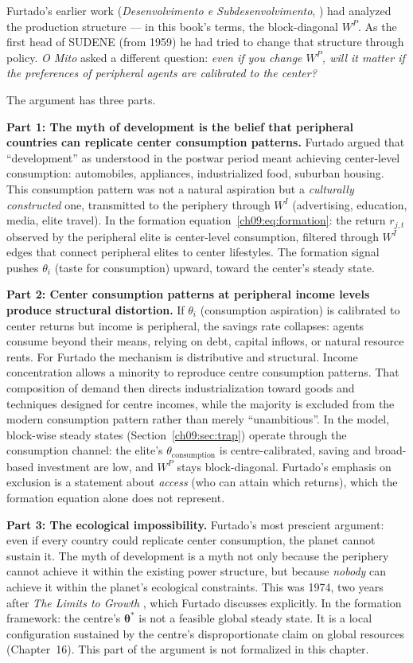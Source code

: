\documentclass[../structural_economics_book.tex]{subfiles}
\begin{document}
Furtado's earlier work (\textit{Desenvolvimento e Subdesenvolvimento}, \citeyear{furtado1961desenvolvimento}) had analyzed the production structure --- in this book's terms, the block-diagonal $W^P$. As the first head of SUDENE (from 1959) he had tried to change that structure through policy. \textit{O Mito} asked a different question: \textit{even if you change $W^P$, will it matter if the preferences of peripheral agents are calibrated to the center?}

The argument has three parts.

\textbf{Part 1: The myth of development is the belief that peripheral countries can replicate center consumption patterns.} Furtado argued that ``development'' as understood in the postwar period meant achieving center-level consumption: automobiles, appliances, industrialized food, suburban housing. This consumption pattern was not a natural aspiration but a \textit{culturally constructed} one, transmitted to the periphery through $W^I$ (advertising, education, media, elite travel). In the formation equation~\eqref{ch09:eq:formation}: the return $r_{j,t}$ observed by the peripheral elite is center-level consumption, filtered through $W^I$ edges that connect peripheral elites to center lifestyles. The formation signal pushes $\theta_i$ (taste for consumption) upward, toward the center's steady state.

\textbf{Part 2: Center consumption patterns at peripheral income levels produce structural distortion.} If $\theta_i$ (consumption aspiration) is calibrated to center returns but income is peripheral, the savings rate collapses: agents consume beyond their means, relying on debt, capital inflows, or natural resource rents. For Furtado the mechanism is distributive and structural. Income concentration allows a minority to reproduce centre consumption patterns. That composition of demand then directs industrialization toward goods and techniques designed for centre incomes, while the majority is excluded from the modern consumption pattern rather than merely ``unambitious''. In the model, block-wise steady states (Section~\ref{ch09:sec:trap}) operate through the consumption channel: the elite's $\theta_{\text{consumption}}$ is centre-calibrated, saving and broad-based investment are low, and $W^P$ stays block-diagonal. Furtado's emphasis on exclusion is a statement about \textit{access} (who can attain which returns), which the formation equation alone does not represent.

\textbf{Part 3: The ecological impossibility.} Furtado's most prescient argument: even if every country could replicate center consumption, the planet cannot sustain it. The myth of development is a myth not only because the periphery cannot achieve it within the existing power structure, but because \textit{nobody} can achieve it within the planet's ecological constraints. This was 1974, two years after \textit{The Limits to Growth} \citep{meadows1972limits}, which Furtado discusses explicitly. In the formation framework: the centre's $\boldsymbol{\theta}^*$ is not a feasible global steady state. It is a local configuration sustained by the centre's disproportionate claim on global resources (Chapter~16). This part of the argument is not formalized in this chapter.
\end{document}
